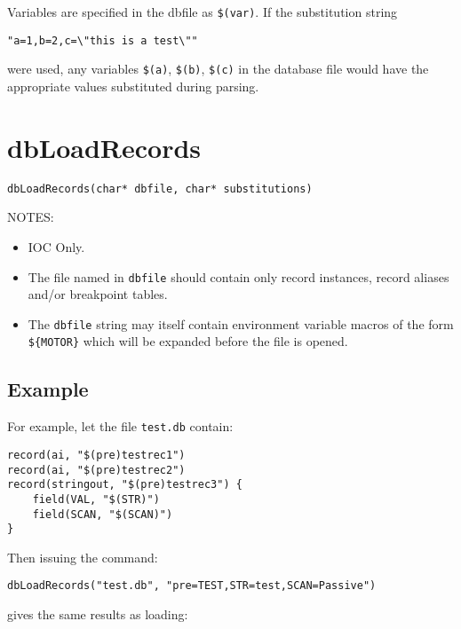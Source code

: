 Variables are specified in the dbfile as \verb|$(var)|.
If the substitution string

\begin{verbatim}
"a=1,b=2,c=\"this is a test\""
\end{verbatim}

were used, any variables \verb|$(a)|, \verb|$(b)|, \verb|$(c)| in the database file would have the appropriate values substituted during parsing.

\section{dbLoadRecords}

\begin{verbatim}
dbLoadRecords(char* dbfile, char* substitutions)
\end{verbatim}

NOTES:

\begin{itemize}
\item IOC Only.

\item The file named in \verb|dbfile| should contain only record instances, record aliases and/or breakpoint tables.

\item The \verb|dbfile| string may itself contain environment variable macros of the form \verb|${MOTOR}| which will be expanded before the file is opened.

\end{itemize}

\subsection{Example}

For example, let the file \verb|test.db| contain:

\begin{verbatim}
record(ai, "$(pre)testrec1")
record(ai, "$(pre)testrec2")
record(stringout, "$(pre)testrec3") {
    field(VAL, "$(STR)")
    field(SCAN, "$(SCAN)")
}
\end{verbatim}

Then issuing the command:

\begin{verbatim}
dbLoadRecords("test.db", "pre=TEST,STR=test,SCAN=Passive")
\end{verbatim}

gives the same results as loading:

